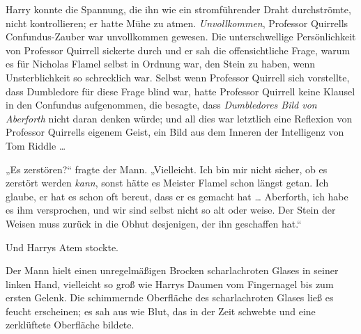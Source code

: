 Harry konnte die Spannung, die ihn wie ein stromführender Draht durchströmte, nicht kontrollieren; er hatte Mühe zu atmen. \emph{Unvollkommen}, Professor Quirrells Confundus-Zauber war unvollkommen gewesen. Die unterschwellige Persönlichkeit von Professor Quirrell sickerte durch und er sah die offensichtliche Frage, warum es für Nicholas Flamel selbst in Ordnung war, den Stein zu haben, wenn Unsterblichkeit so schrecklich war. Selbst wenn Professor Quirrell sich vorstellte, dass Dumbledore für diese Frage blind war, hatte Professor Quirrell keine Klausel in den Confundus aufgenommen, die besagte, dass \emph{Dumbledores Bild von Aberforth} nicht daran denken würde; und all dies war letztlich eine Reflexion von Professor Quirrells eigenem Geist, ein Bild aus dem Inneren der Intelligenz von Tom Riddle …

„Es zerstören?“ fragte der Mann.
„Vielleicht. Ich bin mir nicht sicher, ob es zerstört werden \emph{kann}, sonst hätte es Meister Flamel schon längst getan. Ich glaube, er hat es schon oft bereut, dass er es gemacht hat … Aberforth, ich habe es ihm versprochen, und wir sind selbst nicht so alt oder weise. Der Stein der Weisen muss zurück in die Obhut desjenigen, der ihn geschaffen hat.“

Und Harrys Atem stockte.

Der Mann hielt einen unregelmäßigen Brocken scharlachroten Glases in seiner linken Hand, vielleicht so groß wie Harrys Daumen vom Fingernagel bis zum ersten Gelenk. Die schimmernde Oberfläche des scharlachroten Glases ließ es feucht erscheinen; es sah aus wie Blut, das in der Zeit schwebte und eine zerklüftete Oberfläche bildete.


